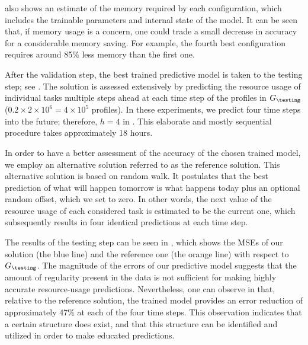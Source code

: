  also shows an estimate of the memory required by each
configuration, which includes the trainable parameters and internal state of the
model. It can be seen that, if memory usage is a concern, one could trade a
small decrease in accuracy for a considerable memory saving. For example, the
fourth best configuration requires around 85\% less memory than the first one.

After the validation step, the best trained predictive model is taken to the
testing step; see . The solution is assessed extensively by
predicting the resource usage of individual tasks multiple steps ahead at each
time step of the profiles in $G_\testing$ ($0.2 \times 2 \times 10^6 = 4 \times
10^5$ profiles). In these experiments, we predict four time steps into the
future; therefore, $h = 4$ in . This elaborate and mostly
sequential procedure takes approximately 18 hours.

In order to have a better assessment of the accuracy of the chosen trained
model, we employ an alternative solution referred to as the reference solution.
This alternative solution is based on random walk. It postulates that the best
prediction of what will happen tomorrow is what happens today plus an optional
random offset, which we set to zero. In other words, the next value of the
resource usage of each considered task is estimated to be the current one, which
subsequently results in four identical predictions at each time step.

The results of the testing step can be seen in , which shows
the \acp{MSE} of our solution (the blue line) and the reference one (the orange
line) with respect to $G_\testing$. The magnitude of the errors of our
predictive model suggests that the amount of regularity present in the data is
not sufficient for making highly accurate resource-usage predictions.
Nevertheless, one can observe in  that, relative to the
reference solution, the trained model provides an error reduction of
approximately 47\% at each of the four time steps. This observation indicates
that a certain structure does exist, and that this structure can be identified
and utilized in order to make educated predictions.
